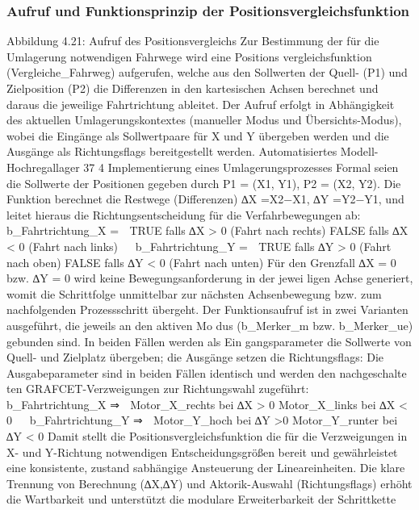 \subsubsection{Aufruf und Funktionsprinzip der Positionsvergleichsfunktion}
Abbildung 4.21: Aufruf des Positionsvergleichs
Zur Bestimmung der für die Umlagerung notwendigen Fahrwege wird eine Positions
vergleichsfunktion (Vergleiche_Fahrweg) aufgerufen, welche aus den Sollwerten der
Quell- (P1) und Zielposition (P2) die Differenzen in den kartesischen Achsen berechnet
und daraus die jeweilige Fahrtrichtung ableitet. Der Aufruf erfolgt in Abhängigkeit des
aktuellen Umlagerungskontextes (manueller Modus und Übersichts-Modus), wobei die
Eingänge als Sollwertpaare für X und Y übergeben werden und die Ausgänge als
Richtungsflags bereitgestellt werden.
Automatisiertes Modell- Hochregallager
37
4 Implementierung eines Umlagerungsprozesses
Formal seien die Sollwerte der Positionen gegeben durch
P1 = (X1, Y1),
P2 = (X2, Y2).
Die Funktion berechnet die Restwege (Differenzen)
∆X =X2−X1, ∆Y =Y2−Y1,
und leitet hieraus die Richtungsentscheidung für die Verfahrbewegungen ab:


b_Fahrtrichtung_X =

TRUE falls ∆X > 0 (Fahrt nach rechts)
FALSE falls ∆X < 0 (Fahrt nach links)


b_Fahrtrichtung_Y =

TRUE falls ∆Y > 0 (Fahrt nach oben)
FALSE falls ∆Y < 0 (Fahrt nach unten)
Für den Grenzfall ∆X = 0 bzw. ∆Y = 0 wird keine Bewegungsanforderung in der jewei
ligen Achse generiert, womit die Schrittfolge unmittelbar zur nächsten Achsenbewegung
bzw. zum nachfolgenden Prozessschritt übergeht.
Der Funktionsaufruf ist in zwei Varianten ausgeführt, die jeweils an den aktiven Mo
dus (b_Merker_m bzw. b_Merker_ue) gebunden sind. In beiden Fällen werden als Ein
gangsparameter die Sollwerte von Quell- und Zielplatz übergeben; die Ausgänge setzen
die Richtungsflags:
Die Ausgabeparameter sind in beiden Fällen identisch und werden den nachgeschalte
ten GRAFCET-Verzweigungen zur Richtungswahl zugeführt:


b_Fahrtrichtung_X ⇒

Motor_X_rechts bei ∆X > 0
Motor_X_links bei ∆X < 0


b_Fahrtrichtung_Y ⇒

Motor_Y_hoch
bei ∆Y >0
Motor_Y_runter bei ∆Y < 0
Damit stellt die Positionsvergleichsfunktion die für die Verzweigungen in X- und Y-Richtung
notwendigen Entscheidungsgrößen bereit und gewährleistet eine konsistente, zustand
sabhängige Ansteuerung der Lineareinheiten. Die klare Trennung von Berechnung
(∆X,∆Y) und Aktorik-Auswahl (Richtungsflags) erhöht die Wartbarkeit und unterstützt
die modulare Erweiterbarkeit der Schrittkette

